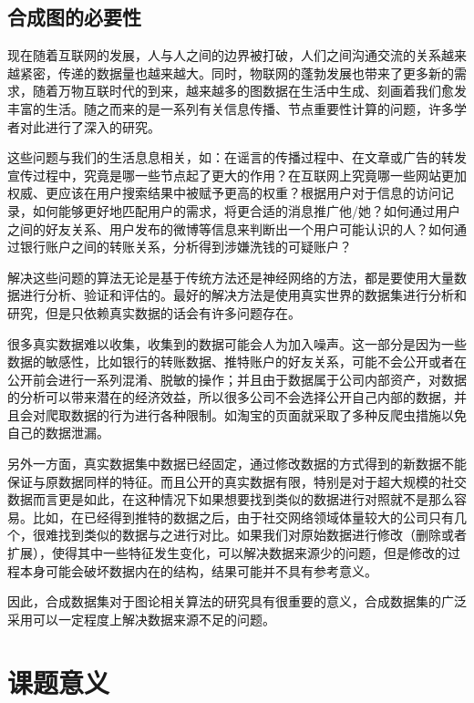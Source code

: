 \subsection{合成图的必要性}

现在随着互联网的发展，人与人之间的边界被打破，人们之间沟通交流的关系越来越紧密，传递的数据量也越来越大。同时，物联网的蓬勃发展也带来了更多新的需求，随着万物互联时代的到来，越来越多的图数据在生活中生成、刻画着我们愈发丰富的生活。随之而来的是一系列有关信息传播、节点重要性计算的问题，许多学者对此进行了深入的研究。

这些问题与我们的生活息息相关，如：在谣言的传播过程中\cite{daley1965stochastic}\cite{maki1973mathematical}、在文章或广告的转发宣传过程中，究竟是哪一些节点起了更大的作用？在互联网上究竟哪一些网站更加权威、更应该在用户搜索结果中被赋予更高的权重？根据用户对于信息的访问记录，如何能够更好地匹配用户的需求，将更合适的消息推广他/她？如何通过用户之间的好友关系、用户发布的微博等信息来判断出一个用户可能认识的人？如何通过银行账户之间的转账关系，分析得到涉嫌洗钱的可疑账户？

解决这些问题的算法无论是基于传统方法还是神经网络的方法，都是要使用大量数据进行分析、验证和评估的。最好的解决方法是使用真实世界的数据集进行分析和研究，但是只依赖真实数据的话会有许多问题存在。

很多真实数据难以收集，收集到的数据可能会人为加入噪声。这一部分是因为一些数据的敏感性，比如银行的转账数据、推特账户的好友关系，可能不会公开或者在公开前会进行一系列混淆、脱敏的操作；并且由于数据属于公司内部资产，对数据的分析可以带来潜在的经济效益，所以很多公司不会选择公开自己内部的数据，并且会对爬取数据的行为进行各种限制。如淘宝的页面就采取了多种反爬虫措施以免自己的数据泄漏。

另外一方面，真实数据集中数据已经固定，通过修改数据的方式得到的新数据不能保证与原数据同样的特征。而且公开的真实数据有限，特别是对于超大规模的社交数据而言更是如此，在这种情况下如果想要找到类似的数据进行对照就不是那么容易。比如，在已经得到推特的数据之后，由于社交网络领域体量较大的公司只有几个，很难找到类似的数据与之进行对比。如果我们对原始数据进行修改（删除或者扩展），使得其中一些特征发生变化，可以解决数据来源少的问题，但是修改的过程本身可能会破坏数据内在的结构，结果可能并不具有参考意义。

因此，合成数据集对于图论相关算法的研究具有很重要的意义，合成数据集的广泛采用可以一定程度上解决数据来源不足的问题。

\section{课题意义}

